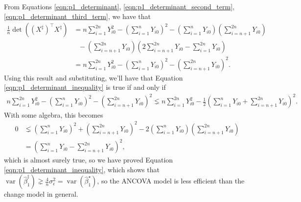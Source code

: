 \documentclass[letterpaper,11pt]{article}
\begin{document}
\begin{enumerate}
\begin{enumerate}
\begin{description}
      From Equations \ref{eqn:p1_determinant},
      \ref{eqn:p1_determinant_second_term}, \ref{eqn:p1_determinant_third_term},
      we have that
      \begin{align*}
        \frac{1}{n}\det\left(\left(X^\ddagger\right)^\intercal X^\ddagger\right)
        &= n\sum_{i=1}^{2n}Y_{i0}^2 - \left(\sum_{i=1}^{n}Y_{i0}\right)^2 - \left(
          \sum_{i=1}^{n}Y_{i0}\right)\left(\sum_{i=n+1}^{2n}Y_{i0}\right) \\
        &~~~- \left(\sum_{i=n+1}^{2n}Y_{i0}\right)\left(
          2\sum_{i=n + 1}^{2n} Y_{i0} - \sum_{i=1}^{2n}Y_{i0}
          \right) \\
        &= n\sum_{i=1}^{2n}Y_{i0}^2 - \left(\sum_{i=1}^{n}Y_{i0}\right)^2 -
          \left(\sum_{i=n+1}^{2n}Y_{i0}\right)^2.
      \end{align*}
      Using this result and substituting, we'll have that Equation
      \ref{eqn:p1_determinant_inequality} is true if and only if
      \begin{align*}
        n\sum_{i=1}^{2n}Y_{i0}^2
        - \left(\sum_{i=1}^{n}Y_{i0}\right)^2 -
        \left(\sum_{i=n+1}^{2n}Y_{i0}\right)^2
        \lneq
          n\sum_{i=1}^{2n} Y_{i0}^2 - \frac{1}{2}\left(\sum_{i=1}^{n}Y_{i0}
           + \sum_{i=n+1}^{2n}Y_{i0}
          \right)^2.
      \end{align*}
      With some algebra, this becomes
      \begin{align*}
        0 &\lneq \left(\sum_{i=1}^{n}Y_{i0}\right)^2
        + \left(\sum_{i=n+1}^{2n}Y_{i0}\right)^2
        -2\left(\sum_{i=1}^{n}Y_{i0}\right)\left(\sum_{i=n+1}^{2n}Y_{i0}\right) \\
          &= \left(\sum_{i=1}^{n}Y_{i0} - \sum_{i=n+1}^{2n}Y_{i0}\right)^2,
      \end{align*}
      which is almost surely true, so we have proved Equation
      \ref{eqn:p1_determinant_inequality}, which shows that
      $\operatorname{var}\left(\hat{\beta}_1^\ddagger\right) \gneq
      \frac{4}{n}\sigma_\epsilon^2 =
      \operatorname{var}\left(\hat{\beta}_1^\star\right)$, so the ANCOVA model
      is less efficient than the change model in general.
    \end{description}
  \end{enumerate}
\end{enumerate}
\end{document}
